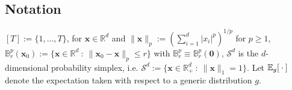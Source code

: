 \subsection{Notation}

$[T] := \{1, \ldots, T\}$, for $\mathbf{x}\in\mathbb{R}^d$ and  $\lVert \mathbf{x} \rVert_p := \left(\sum_{i=1}^d |x_i|^p\right)^{1/p}$ for $p \geq 1$, $\mathbb{B}_{r}^{p}(\mathbf{x}_0) := \{\mathbf{x}\in\mathbb{R}^d \::\: \lVert \mathbf{x}_0 - \mathbf{x} \rVert_p \leq r\}$ with $\mathbb{B}_{r}^{p} \equiv \mathbb{B}_{r}^{p}(\mathbf{0})$, $\mathcal{S}^d$ is the $d$-dimensional probability simplex, i.e. $\mathcal{S}^d := \{\mathbf{x}\in\mathbb{R}^d_+ \::\: \lVert \mathbf{x} \rVert_1 =1\}$. Let $\mathbb{E}_{g} [\:\cdot\:]$ denote the expectation taken with respect to a generic distribution $g$.